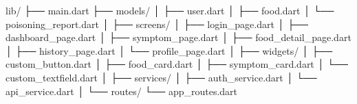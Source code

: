 lib/
├── main.dart
├── models/
│   ├── user.dart
│   ├── food.dart
│   └── poisoning_report.dart
│
├── screens/
│   ├── login_page.dart
│   ├── dashboard_page.dart
│   ├── symptom_page.dart
│   ├── food_detail_page.dart
│   ├── history_page.dart
│   └── profile_page.dart
│
├── widgets/
│   ├── custom_button.dart
│   ├── food_card.dart
│   ├── symptom_card.dart
│   └── custom_textfield.dart
│
├── services/
│   ├── auth_service.dart
│   └── api_service.dart
│
└── routes/
    └── app_routes.dart